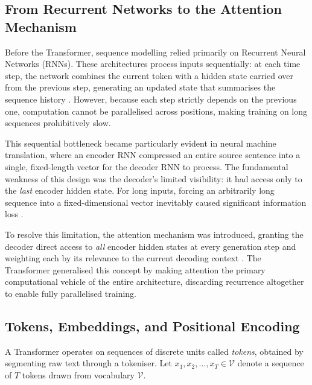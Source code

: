 \subsection{From Recurrent Networks to the Attention Mechanism}
\label{subsec:rnn_to_attention}

Before the Transformer, sequence modelling relied primarily on Recurrent Neural Networks (RNNs). These architectures process inputs sequentially: at each time step, the network combines the current token with a hidden state carried over from the previous step, generating an updated state that summarises the sequence history \citep{tunstall2022natural}. However, because each step strictly depends on the previous one, computation cannot be parallelised across positions, making training on long sequences prohibitively slow.

This sequential bottleneck became particularly evident in neural machine translation, where an encoder RNN compressed an entire source sentence into a single, fixed-length vector for the decoder RNN to process. The fundamental weakness of this design was the decoder's limited visibility: it had access only to the \emph{last} encoder hidden state. For long inputs, forcing an arbitrarily long sequence into a fixed-dimensional vector inevitably caused significant information loss \citep{tunstall2022natural}.

To resolve this limitation, the attention mechanism was introduced, granting the decoder direct access to \emph{all} encoder hidden states at every generation step and weighting each by its relevance to the current decoding context \citep{tunstall2022natural}. The Transformer generalised this concept by making attention the primary computational vehicle of the entire architecture, discarding recurrence altogether to enable fully parallelised training.
\subsection{Tokens, Embeddings, and Positional Encoding}
\label{subsec:embeddings}

A Transformer operates on sequences of discrete units called \emph{tokens}, obtained
by segmenting raw text through a tokeniser. Let $x_1, x_2, \ldots, x_T \in
\mathcal{V}$ denote a sequence of $T$ tokens drawn from vocabulary $\mathcal{V}$.

